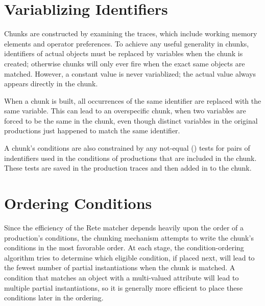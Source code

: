 \section{Variablizing Identifiers}
\label{CHUNKING-variablizing}

Chunks are constructed by examining the traces, which include working memory
elements and operator preferences. To achieve any useful generality in chunks,
identifiers of actual objects must be replaced by variables when the chunk is
created; otherwise chunks will only ever fire when the exact same objects
are matched.  However, a constant value is never variablized; the actual 
value always appears directly in the chunk.

When a chunk is built, all occurrences of the same identifier are replaced
with the same variable. This can lead to an overspecific chunk, when two
variables are forced to be the same in the chunk, even though distinct
variables in the original productions just happened to match the same
identifier.

A chunk's conditions are also constrained by any not-equal (\soar{<>}) tests
for pairs of indentifiers used in the conditions of productions that are
included in the chunk. These tests are saved in the production traces and then
added in to the chunk.

\section{Ordering Conditions}
\label{CHUNKING-ordering}


Since the efficiency of the Rete matcher  \cite{Forg81} depends
heavily upon the order of a production's conditions, the chunking mechanism
attempts to write the chunk's conditions in the most favorable order. At each
stage, the condition-ordering algorithm tries to determine which eligible
condition, if placed next, will lead to the fewest number of partial
instantiations when the chunk is matched. A condition that matches an object
with a multi-valued attribute will lead to multiple partial instantiations, so
it is generally more efficient to place these conditions later in the
ordering.

